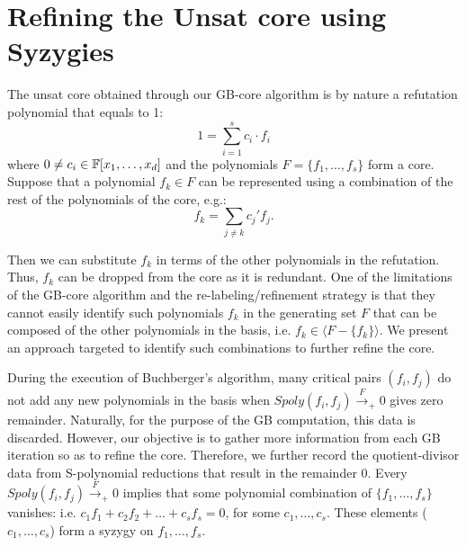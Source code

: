 \section{Refining the Unsat core using Syzygies}
\label{sec:syz}


The unsat core obtained through our GB-core algorithm is by nature a
refutation polynomial that equals to 1:  
$$1 = \sum_{i=1}^s c_i\cdot f_i$$
where $0 \neq c_i \in {\mathbb{F}}[x_1,\dots,x_d]$ and the polynomials
$F = \{f_1,\dots,f_s\}$ form a core. Suppose that a polynomial 
$f_k \in F$ can be represented using a combination of the rest of the
polynomials of the core, e.g.:
$$f_k = \sum_{j\neq k} c_j'f_j.$$

Then we can substitute $f_k$ in terms of the other polynomials in the
refutation. Thus, $f_k$ can be dropped from the core as it is 
redundant. One of the limitations of the GB-core algorithm and the
re-labeling/refinement strategy is that they cannot easily identify
such polynomials $f_k$ in the generating set $F$ that can be composed
of the other polynomials in the basis, i.e. 
$f_k \in \langle F-\{f_k\} \rangle$. We present an approach targeted
to identify such combinations to further refine the core. 
 
 
During the execution of Buchberger's algorithm, many critical pairs
$(f_i,f_j)$ do not add any new polynomials in the basis when
$Spoly(f_i,f_j)\xrightarrow{F}_+0$ gives zero remainder. Naturally,
for the purpose of the GB computation, this data is
discarded. However, our objective is to gather more information from
each GB iteration so as to refine the core. Therefore, we further
record the quotient-divisor data from S-polynomial reductions that
result in the remainder 0. Every $Spoly(f_i,f_j)\xrightarrow{F}_+0$
implies that some polynomial combination of $\{f_1,\dots,f_s\}$
vanishes: i.e. $c_1f_1 + c_2f_2 + \dots+c_sf_s=0$, for some
$c_1,\dots,c_s$. These elements ($c_1,\dots,c_s$) form a syzygy on $f_1,\dots,f_s$. 

